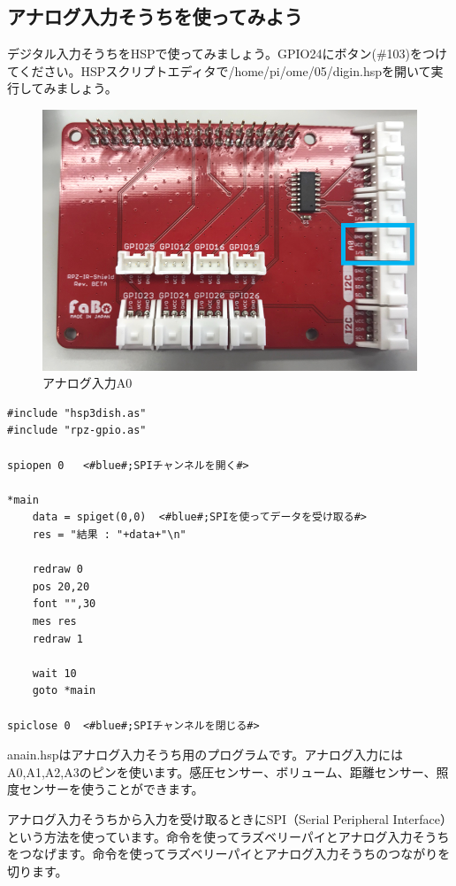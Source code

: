 \subsection{アナログ入力そうちを使ってみよう}
デジタル入力そうちをHSPで使ってみましょう。GPIO24にボタン(\#103)をつけてください。HSPスクリプトエディタで/home/pi/ome/05/digin.hspを開いて実行してみましょう。\\
\begin{figure}[H]
    \centering
    \includegraphics[scale=0.8]{images/chap05/text05-img030.png}
    \caption{アナログ入力A0}
\end{figure}

\begin{lstlisting}[caption=anain.hsp,label=anain.hsp]
#include "hsp3dish.as"
#include "rpz-gpio.as"

spiopen 0	<#blue#;SPIチャンネルを開く#>

*main
	data = spiget(0,0)	<#blue#;SPIを使ってデータを受け取る#>
	res = "結果 : "+data+"\n"

	redraw 0
	pos 20,20
	font "",30
	mes res
	redraw 1

	wait 10
	goto *main

spiclose 0	<#blue#;SPIチャンネルを閉じる#>
\end{lstlisting}

anain.hspはアナログ入力そうち用のプログラムです。アナログ入力にはA0,A1,A2,A3のピンを使います。感圧センサー、ボリューム、距離センサー、照度センサーを使うことができます。

アナログ入力そうちから入力を受け取るときにSPI（Serial Peripheral Interface）という方法を使っています。命令を使ってラズベリーパイとアナログ入力そうちをつなげます。命令を使ってラズベリーパイとアナログ入力そうちのつながりを切ります。

